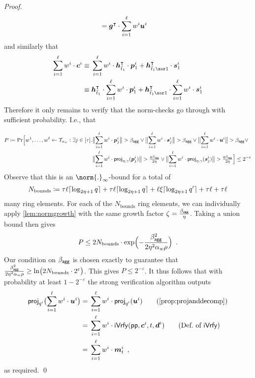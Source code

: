 \begin{proof}
\begin{align*}
  ={}&\boldsymbol{g}^\intercal\cdot\sum_{i=1}^{\ell}w^i\boldsymbol{u}^i 
\end{align*}
and similarly that 
\begin{align*}
  \sum_{i=1}^{\ell}w^i\cdot \vec{c}^i \equiv{}&\sum_{i=1}^{\ell}w^i\cdot \vec{h}_{\tilde t_1}^\transpose\cdot \vec{p}_{1}^i + \vec{h}_{\tilde t_1 \xor 1}^\transpose \cdot \vec{s}_{1}^i\\
  \equiv{}&\vec{h}_{\tilde t_1}^\transpose\cdot \sum_{i=1}^{\ell}w^i\cdot \vec{p}_{1}^i + \vec{h}_{\tilde t_1 \xor 1}^\transpose \cdot \sum_{i=1}^{\ell}w^i\cdot \vec{s}_{1}^i
\end{align*}
Therefore it only remains to verify that the norm-checks go through with sufficient probability.
I.e., that

\begin{align*}
    P\coloneqq\Pr\Bigl[
      w^1,\dots,w^{\ell} \gets \mathcal{T}_{\alpha_w} :
      \exists j\in[\tau]\ldotp&
      \bigl\Vert\sum_{i=1}^{\ell}w^i\cdot \boldsymbol{p}_j^i\bigr\Vert > \beta_{\mathsf{agg}} 
      \lor 
      \bigl\Vert\sum_{i=1}^{\ell}w^i\cdot \boldsymbol{s}_j^i\bigr\Vert > \beta_{\mathsf{agg}}
      \lor
      \bigl\Vert\sum_{i=1}^{\ell}w^i\cdot\boldsymbol{u}^i\bigr\Vert > \beta_{\mathsf{agg}}
      \lor\\
      {}&
      \bigl\Vert\sum_{i=1}^{\ell}w^i\cdot\mathsf{proj}_{\eta,\gamma}(\boldsymbol{p}_j^i)\bigr\Vert > \tfrac{q\beta_{\mathsf{agg}}}{2\eta}
      \lor
      \bigl\Vert\sum_{i=1}^{\ell}w^i\cdot\mathsf{proj}_{\eta,\gamma}(\boldsymbol{s}_j^i)\bigr\Vert > \tfrac{q\beta_{\mathsf{agg}}}{2\eta}
    \Bigr] \leq 2^{-\varepsilon}
\end{align*}
Observe that this is an $\norm{.}_\infty$-bound for a total of
\[
  N_\textrm{bounds} \coloneqq \tau\ell \lceil\log_{2\eta+1}q\rceil + \tau\ell\lceil\log_{2\eta+1}q\rceil + \ell\xi\lceil\log_{2\eta+1}q'\rceil + \tau\ell + \tau\ell
\]
many ring elements.
For each of the $N_\textrm{bounds}$ ring elements, we can individually apply \autoref{lem:normgrowth} with the same growth factor $\zeta =\tfrac{\beta_{\mathsf{agg}}}{\eta}$.
Taking a union bound then gives
\[
 P \leq 2N_{\textrm{bounds}}\cdot \exp\Bigl(-\frac{\beta_{\mathsf{agg}}^2}{2\eta^2\alpha_w\rho}\Bigr)\enspace.
\]
Our condition on $\beta_{\mathsf{agg}}$ is chosen exactly to guarantee that $\tfrac{\beta_{\mathsf{agg}}^2}{2\eta^2\alpha_w\rho} \geq \ln\bigl(2N_{\textrm{bounds}}\cdot 2^\varepsilon \bigr)$.
This gives $P\leq 2^{-\varepsilon}$.
It thus follows that with probability at least $1-2^{-\varepsilon}$ the strong verification algorithm outputs
  \begin{align*}
    \projmod{q'}\bigl(\sum_{i=1}^{\ell}w^i \cdot \vec{u}^i\bigr)
    ={}&\sum_{i=1}^{\ell}w^i \cdot \projmod{q'}(\vec{u}^i) \tag{\autoref{prop:projanddecomp}}\\
    ={}&\sum_{i=1}^{\ell}w^i \cdot \iverify(\params,\vec{c}^i,t,\vec{d}^i)\tag{Def.\ of $\iverify$}\\
    ={}&\sum_{i=1}^{\ell}w^i \cdot \vec{m}_t^i\enspace,
  \end{align*}
  as required.%
  \qed
 

\end{proof}
